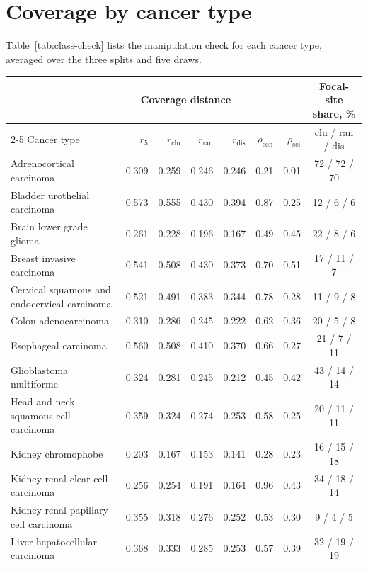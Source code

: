 \section{Coverage by cancer type}
\label{app:class-coverage}
Table~\ref{tab:class-check} lists the manipulation check for each cancer type, averaged over the three splits and five draws.

\begin{table}[htbp]
\centering
\footnotesize
\setlength{\tabcolsep}{4pt}
\renewcommand{\arraystretch}{1.1}
\begin{tabular}{@{}lrrrrrrc@{}}
\toprule
 & \multicolumn{4}{c}{Coverage distance} & & & Focal-site share, \% \\
\cmidrule(lr){2-5}
Cancer type & $r_{5}$ & $r_{\mathrm{clu}}$ & $r_{\mathrm{ran}}$ & $r_{\mathrm{dis}}$ & $\rho_{\mathrm{con}}$ & $\rho_{\mathrm{sel}}$ & clu / ran / dis \\
\midrule
Adrenocortical carcinoma & 0.309 & 0.259 & 0.246 & 0.246 & 0.21 & 0.01 & 72 / 72 / 70 \\
Bladder urothelial carcinoma & 0.573 & 0.555 & 0.430 & 0.394 & 0.87 & 0.25 & 12 / 6 / 6 \\
Brain lower grade glioma & 0.261 & 0.228 & 0.196 & 0.167 & 0.49 & 0.45 & 22 / 8 / 6 \\
Breast invasive carcinoma & 0.541 & 0.508 & 0.430 & 0.373 & 0.70 & 0.51 & 17 / 11 / 7 \\
Cervical squamous and endocervical carcinoma & 0.521 & 0.491 & 0.383 & 0.344 & 0.78 & 0.28 & 11 / 9 / 8 \\
Colon adenocarcinoma & 0.310 & 0.286 & 0.245 & 0.222 & 0.62 & 0.36 & 20 / 5 / 8 \\
Esophageal carcinoma & 0.560 & 0.508 & 0.410 & 0.370 & 0.66 & 0.27 & 21 / 7 / 11 \\
Glioblastoma multiforme & 0.324 & 0.281 & 0.245 & 0.212 & 0.45 & 0.42 & 43 / 14 / 14 \\
Head and neck squamous cell carcinoma & 0.359 & 0.324 & 0.274 & 0.253 & 0.58 & 0.25 & 20 / 11 / 11 \\
Kidney chromophobe & 0.203 & 0.167 & 0.153 & 0.141 & 0.28 & 0.23 & 16 / 15 / 18 \\
Kidney renal clear cell carcinoma & 0.256 & 0.254 & 0.191 & 0.164 & 0.96 & 0.43 & 34 / 18 / 14 \\
Kidney renal papillary cell carcinoma & 0.355 & 0.318 & 0.276 & 0.252 & 0.53 & 0.30 & 9 / 4 / 5 \\
Liver hepatocellular carcinoma & 0.368 & 0.333 & 0.285 & 0.253 & 0.57 & 0.39 & 32 / 19 / 19 \\

\end{tabular}
\end{table}
